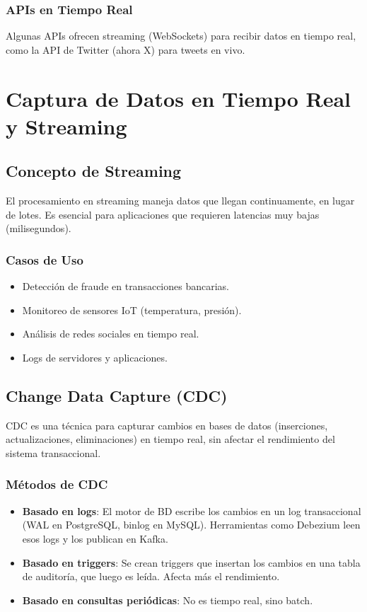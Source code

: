 \documentclass[12pt,a4paper,openany,oneside]{book}
\begin{document}
\subsection{APIs en Tiempo Real}
Algunas APIs ofrecen streaming (WebSockets) para recibir datos en tiempo real, como la API de Twitter (ahora X) para tweets en vivo.

\chapter{Captura de Datos en Tiempo Real y Streaming}
\section{Concepto de Streaming}
El procesamiento en streaming maneja datos que llegan continuamente, en lugar de lotes. Es esencial para aplicaciones que requieren latencias muy bajas (milisegundos).

\subsection{Casos de Uso}
\begin{itemize}
    \item Detección de fraude en transacciones bancarias.
    \item Monitoreo de sensores IoT (temperatura, presión).
    \item Análisis de redes sociales en tiempo real.
    \item Logs de servidores y aplicaciones.
\end{itemize}

\section{Change Data Capture (CDC)}
CDC es una técnica para capturar cambios en bases de datos (inserciones, actualizaciones, eliminaciones) en tiempo real, sin afectar el rendimiento del sistema transaccional.

\subsection{Métodos de CDC}
\begin{itemize}
    \item \textbf{Basado en logs}: El motor de BD escribe los cambios en un log transaccional (WAL en PostgreSQL, binlog en MySQL). Herramientas como Debezium leen esos logs y los publican en Kafka.
    \item \textbf{Basado en triggers}: Se crean triggers que insertan los cambios en una tabla de auditoría, que luego es leída. Afecta más el rendimiento.
    \item \textbf{Basado en consultas periódicas}: No es tiempo real, sino batch.
\end{itemize}
\end{document}
